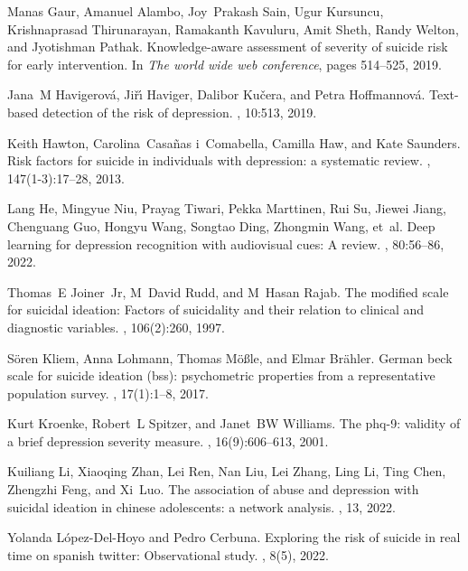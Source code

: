 \begin{thebibliography}{10}
Manas Gaur, Amanuel Alambo, Joy~Prakash Sain, Ugur Kursuncu, Krishnaprasad
  Thirunarayan, Ramakanth Kavuluru, Amit Sheth, Randy Welton, and Jyotishman
  Pathak.
\newblock Knowledge-aware assessment of severity of suicide risk for early
  intervention.
\newblock In {\em The world wide web conference}, pages 514--525, 2019.

Jana~M Havigerov{\'a}, Ji{\v{r}}{\'\i} Haviger, Dalibor Ku{\v{c}}era, and Petra
  Hoffmannov{\'a}.
\newblock Text-based detection of the risk of depression.
, 10:513, 2019.

Keith Hawton, Carolina~Casa{\~n}as i~Comabella, Camilla Haw, and Kate Saunders.
\newblock Risk factors for suicide in individuals with depression: a systematic
  review.
, 147(1-3):17--28, 2013.

Lang He, Mingyue Niu, Prayag Tiwari, Pekka Marttinen, Rui Su, Jiewei Jiang,
  Chenguang Guo, Hongyu Wang, Songtao Ding, Zhongmin Wang, et~al.
\newblock Deep learning for depression recognition with audiovisual cues: A
  review.
, 80:56--86, 2022.

Thomas~E Joiner~Jr, M~David Rudd, and M~Hasan Rajab.
\newblock The modified scale for suicidal ideation: Factors of suicidality and
  their relation to clinical and diagnostic variables.
, 106(2):260, 1997.

S{\"o}ren Kliem, Anna Lohmann, Thomas M{\"o}{\ss}le, and Elmar Br{\"a}hler.
\newblock German beck scale for suicide ideation (bss): psychometric properties
  from a representative population survey.
, 17(1):1--8, 2017.

Kurt Kroenke, Robert~L Spitzer, and Janet~BW Williams.
\newblock The phq-9: validity of a brief depression severity measure.
, 16(9):606--613, 2001.

Kuiliang Li, Xiaoqing Zhan, Lei Ren, Nan Liu, Lei Zhang, Ling Li, Ting Chen,
  Zhengzhi Feng, and Xi~Luo.
\newblock The association of abuse and depression with suicidal ideation in
  chinese adolescents: a network analysis.
, 13, 2022.

Yolanda L{\'o}pez-Del-Hoyo and Pedro Cerbuna.
\newblock Exploring the risk of suicide in real time on spanish twitter:
  Observational study.
, 8(5), 2022.


\end{thebibliography}
